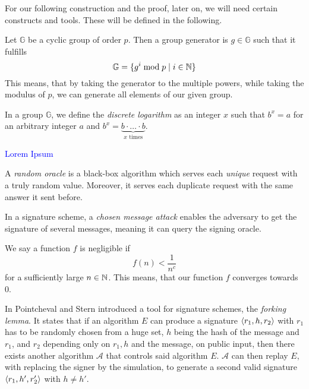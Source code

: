 For our following construction and the proof, later on, we will need certain constructs and tools.
These will be defined in the following.

\begin{definition}
  Let \(\mathbb{G}\) be a cyclic group of order \(p\). Then a group generator is \(g\in\mathbb{G}\) such that it fulfills
    \[\mathbb{G} =  \{ g^i \bmod p \mid i\in\mathbb{N} \}\]
  This means, that by taking the generator to the multiple powers, while taking the modulus of \(p\), we can generate all elements of our given group.
\end{definition}

\begin{definition}
  In a group \(\mathbb{G}\), we define the \textit{discrete logarithm} as an integer \(x\) such that \(b^x = a\) for an arbitrary integer \(a\) and \(b^x = \underbrace{b\cdot \ldots\cdot b}_{x \text{ times}}\).
\end{definition}

\begin{definition}
  \textcolor{blue}{Lorem Ipsum}
\end{definition}

\begin{definition}
  A \textit{random oracle} is a black-box algorithm which serves each \textit{unique} request with a truly random value. Moreover, it serves each duplicate request with the same answer it sent before.
\end{definition}

\begin{definition}
  In a signature scheme, a \textit{chosen message attack} enables the adversary to get the signature of several messages, meaning it can query the signing oracle.
\end{definition}

\begin{definition}
  We say a function \(f\) is negligible if 
  \[f(n) < \frac{1}{n^c}\]
  for a sufficiently large \(n\in\mathbb{N}\). This means, that our function \(f\) converges towards 0. 
\end{definition}

\begin{definition}
  In \cite{pcstern96} Pointcheval and Stern introduced a tool for signature schemes, the \textit{forking lemma}. 
  It states that if an algorithm \(E\) can produce a signature \(\langle r_1, h, r_2 \rangle\) with \(r_1\) has to be randomly chosen from a huge set, \(h\) being the hash of the message and \(r_1\), and \(r_2\) depending only on \(r_1, h\) and the message, on public input, then there exists another algorithm \(\mathcal{A}\) that controls said algorithm \(E\).
  \(\mathcal{A}\) can then replay \(E\), with replacing the signer by the simulation, to generate a second valid signature \(\langle r_1, h', r_2' \rangle\) with \(h\neq h'\).
\end{definition}

